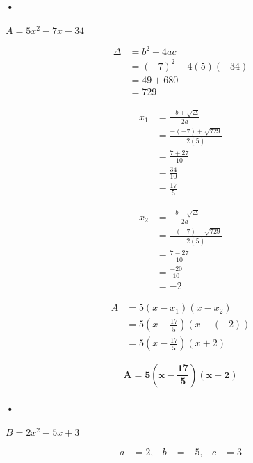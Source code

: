 \documentclass[12pt,a4paper]{article}
\begin{document}
\begin{enumerate}
\paragraph{•}  
\(
A = 5x^2 - 7x - 34
\)

\[
\begin{aligned}
\Delta &= b^2 - 4ac \\
       &= (-7)^2 - 4(5)(-34) \\
       &= 49 + 680 \\
       &= 729
\end{aligned}
\]

\[
\begin{aligned}
x_1 &= \frac{-b + \sqrt{\Delta}}{2a} \\
    &= \frac{-(-7) + \sqrt{729}}{2(5)} \\
    &= \frac{7 + 27}{10} \\
    &= \frac{34}{10} \\
    &= \frac{17}{5}
\end{aligned}
\]

\[
\begin{aligned}
x_2 &= \frac{-b - \sqrt{\Delta}}{2a} \\
    &= \frac{-(-7) - \sqrt{729}}{2(5)} \\
    &= \frac{7 - 27}{10} \\
    &= \frac{-20}{10} \\
    &= -2
\end{aligned}
\]

\[
\begin{aligned}
A &= 5(x - x_1)(x - x_2) \\
  &= 5 \left( x - \frac{17}{5} \right) \left( x - (-2) \right) \\
  &= 5 \left( x - \frac{17}{5} \right) \left( x + 2 \right) 
\end{aligned}
\]

\begin{tcolorbox}[colback=yellow!20, colframe=black, sharp corners]
    \[
    \mathbf{A = 5 \left( x - \frac{17}{5} \right) \left( x + 2 \right)}
    \]
\end{tcolorbox}

\paragraph{•}
\(
B = 2x^2 - 5x + 3
\)

\[
\begin{aligned}
a &= 2, & b &= -5, & c &= 3
\end{aligned}
\]


\end{enumerate}
\end{document}
